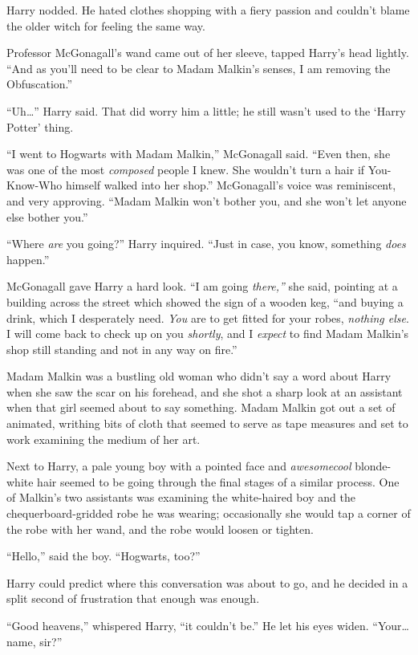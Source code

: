 Harry nodded. He hated clothes shopping with a fiery passion and
couldn't blame the older witch for feeling the same way.

Professor McGonagall's wand came out of her sleeve, tapped Harry's head
lightly. ``And as you'll need to be clear to Madam Malkin's senses, I am
removing the Obfuscation.''

``Uh\ldots{}'' Harry said. That did worry him a little; he still wasn't
used to the `Harry Potter' thing.

``I went to Hogwarts with Madam Malkin,'' McGonagall said. ``Even then,
she was one of the most \emph{composed} people I knew. She wouldn't turn
a hair if You-Know-Who himself walked into her shop.'' McGonagall's
voice was reminiscent, and very approving. ``Madam Malkin won't bother
you, and she won't let anyone else bother you.''

``Where \emph{are} you going?'' Harry inquired. ``Just in case, you
know, something \emph{does} happen.''

McGonagall gave Harry a hard look. ``I am going \emph{there,''} she
said, pointing at a building across the street which showed the sign of
a wooden keg, ``and buying a drink, which I desperately need. \emph{You}
are to get fitted for your robes, \emph{nothing else}. I will come back
to check up on you \emph{shortly}, and I \emph{expect} to find Madam
Malkin's shop still standing and not in any way on fire.''

Madam Malkin was a bustling old woman who didn't say a word about Harry
when she saw the scar on his forehead, and she shot a sharp look at an
assistant when that girl seemed about to say something. Madam Malkin got
out a set of animated, writhing bits of cloth that seemed to serve as
tape measures and set to work examining the medium of her art.

Next to Harry, a pale young boy with a pointed face and
\emph{awesomecool} blonde-white hair seemed to be going through the
final stages of a similar process. One of Malkin's two assistants was
examining the white-haired boy and the chequerboard-gridded robe he was
wearing; occasionally she would tap a corner of the robe with her wand,
and the robe would loosen or tighten.

``Hello,'' said the boy. ``Hogwarts, too?''

Harry could predict where this conversation was about to go, and he
decided in a split second of frustration that enough was enough.

``Good heavens,'' whispered Harry, ``it couldn't be.'' He let his eyes
widen. ``Your\ldots{} name, sir?''

